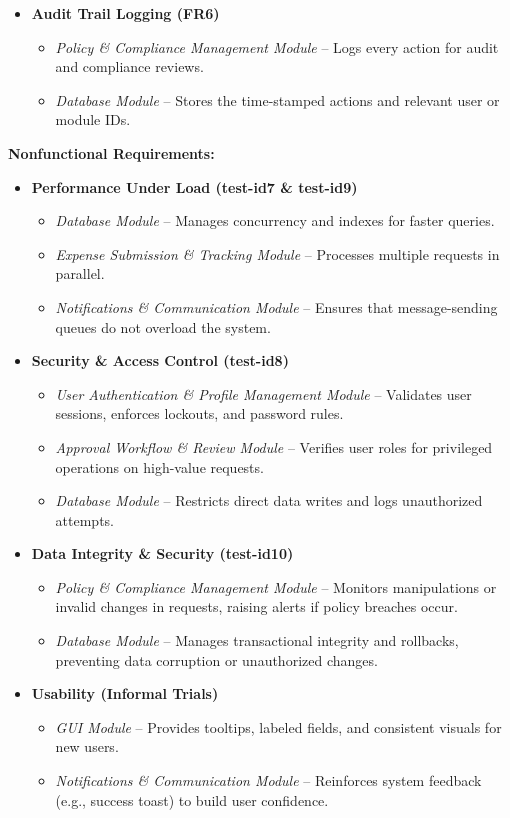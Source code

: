 \documentclass[12pt, titlepage]{article}
\begin{document}
\begin{itemize}
  \item \textbf{Audit Trail Logging (FR6)}
    \begin{itemize}
      \item \emph{Policy \& Compliance Management Module} – Logs every action for audit and compliance reviews.
      \item \emph{Database Module} – Stores the time-stamped actions and relevant user or module IDs.
    \end{itemize}
\end{itemize}

\textbf{Nonfunctional Requirements:}
\begin{itemize}
  \item \textbf{Performance Under Load (test-id7 \& test-id9)}
    \begin{itemize}
      \item \emph{Database Module} – Manages concurrency and indexes for faster queries.
      \item \emph{Expense Submission \& Tracking Module} – Processes multiple requests in parallel.
      \item \emph{Notifications \& Communication Module} – Ensures that message-sending queues do not overload the system.
    \end{itemize}

  \item \textbf{Security \& Access Control (test-id8)}
    \begin{itemize}
      \item \emph{User Authentication \& Profile Management Module} – Validates user sessions, enforces lockouts, and password rules.
      \item \emph{Approval Workflow \& Review Module} – Verifies user roles for privileged operations on high-value requests.
      \item \emph{Database Module} – Restricts direct data writes and logs unauthorized attempts.
    \end{itemize}

  \item \textbf{Data Integrity \& Security (test-id10)}
    \begin{itemize}
      \item \emph{Policy \& Compliance Management Module} – Monitors manipulations or invalid changes in requests, raising alerts if policy breaches occur.
      \item \emph{Database Module} – Manages transactional integrity and rollbacks, preventing data corruption or unauthorized changes.
    \end{itemize}

  \item \textbf{Usability (Informal Trials)}
    \begin{itemize}
      \item \emph{GUI Module} – Provides tooltips, labeled fields, and consistent visuals for new users.
      \item \emph{Notifications \& Communication Module} – Reinforces system feedback (e.g., success toast) to build user confidence.
    \end{itemize}
\end{itemize}
\end{document}
